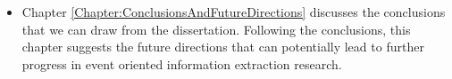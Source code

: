 \begin{itemize}

   \item Chapter \ref{Chapter:ConclusionsAndFutureDirections} discusses the conclusions that we can draw from the dissertation. 
Following the conclusions, this chapter 
suggests the future directions that can potentially lead to 
further progress in event oriented information extraction research.
 
  \end{itemize}

